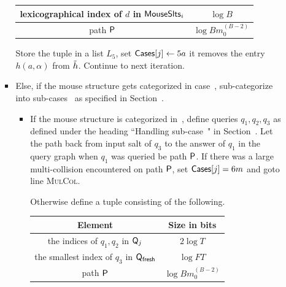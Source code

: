 \begin{enumerate}
\begin{enumerate}
\begin{itemize}
\begin{center}
\begin{tabular}{|c|c|}
		    lexicographical index of $d$ in $\us_i$ & $\log B$ \\ \hline
		    
		    path $\pth$ & $\log Bm_0^{(B-2)}$\\\hline
		    
        \end{tabular}
        \end{center}
   Store the tuple in a list $L_5$, set $\cs[j]\gets 5a$ it removes the entry $h(a,\alpha)$ from $\hrest$. Continue to next iteration.
   
  \item Else, if the mouse structure gets categorized  in case~, sub-categorize into sub-cases~ as specified in Section~.
  \begin{itemize}
      \item If the mouse structure is categorized in~, define queries $q_1,q_2,q_3$ as defined under the heading ``Handling sub-case~" in Section~. Let the path back from input salt of $q_3$ to the answer of $q_1$ in the query graph when $q_1$ was queried be path $\pth$. 
      If there was a large multi-collision encountered on path $\pth$, set $\mathsf{Cases}[j]=6m$ and goto line \textsc{MulCol}.

      Otherwise define a tuple consisting of the following.
      \begin{center}
        \begin{tabular}{|c|c|}\hline

        Element & Size in bits \\ \hline\hline

		    the indices of $q_1,q_2$ in $\mathsf{Q}_j$ & $2\log T$\\ \hline
		
		    the smallest index of $q_3$ in $\mathsf{Q}_\textsf{fresh}$ & $\log FT$   \\\hline
		    		    
		    path $\pth$ & $\log Bm_0^{(B-2)}$\\\hline
		    

\end{tabular}
\end{center}
\end{itemize}
\end{itemize}
\end{enumerate}
\end{enumerate}

